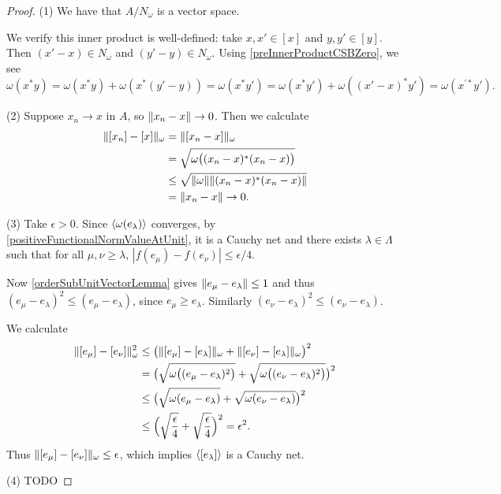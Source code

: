 \begin{proof}
(1) We have that $A/N_\omega$ is a vector space.

We verify this inner product is well-defined: take $x,x'\in [x]$ and $y,y'\in[y]$. Then $(x'-x) \in N_\omega$ and $(y'-y) \in N_\omega$. Using \ref{preInnerProductCSBZero}, we see
\[ \omega(x^*y) = \omega(x^*y) + \omega(x^*(y'-y)) = \omega(x^*y') = \omega(x^*y') + \omega((x'-x)^*y') = \omega(x^{\prime *}y'). \]

(2) Suppose $x_n \to x$ in $A$, so $\lVert x_n - x\rVert\to 0$. Then we calculate
\begin{align*}
\lVert[x_n] - [x]\rVert_\omega &= \lVert[x_n - x]\rVert_\omega \\
&= \sqrt{\omega\big((x_n - x)^*(x_n-x)\big)} \\
&\leq \sqrt{\lVert\omega\rVert\lVert(x_n - x)^*(x_n-x)\rVert} \\
&= \lVert x_n - x\rVert \to 0.
\end{align*}

(3) Take $\epsilon >0$. Since $\left\langle \omega(e_\lambda) \right\rangle$ converges, by \ref{positiveFunctionalNormValueAtUnit}, it is a Cauchy net and there exists $\lambda\in\Lambda$ such that for all $\mu,\nu \geq \lambda$, $|f(e_\mu) - f(e_\nu)| \leq \epsilon/4$.

Now \ref{orderSubUnitVectorLemma} gives $\lVert e_\mu - e_\lambda\rVert \leq 1$ and thus $(e_\mu - e_\lambda)^2\leq (e_\mu - e_\lambda)$, since $e_\mu \geq e_\lambda$. Similarly $(e_\nu - e_\lambda)^2\leq (e_\nu - e_\lambda)$.

We calculate
\begin{align*}
\lVert[e_\mu] - [e_\nu]\rVert_\omega^2 &\leq \big(\lVert[e_\mu] - [e_\lambda]\rVert_\omega + \lVert[e_\nu] - [e_\lambda]\rVert_\omega\big)^2 \\
&= \big(\sqrt{\omega\big((e_\mu - e_\lambda)^2\big)} + \sqrt{\omega\big((e_\nu - e_\lambda)^2\big)}\big)^2 \\
&\leq \big(\sqrt{\omega(e_\mu - e_\lambda)} + \sqrt{\omega(e_\nu - e_\lambda)}\big)^2 \\
&\leq \Big(\sqrt{\frac{\epsilon}{4}} + \sqrt{\frac{\epsilon}{4}}\Big)^2 = \epsilon^2.
\end{align*}
Thus $\lVert[e_\mu] - [e_\nu]\rVert_\omega \leq \epsilon$, which implies $\left\langle [e_\lambda] \right\rangle$ is a Cauchy net.

(4) TODO
\end{proof}

